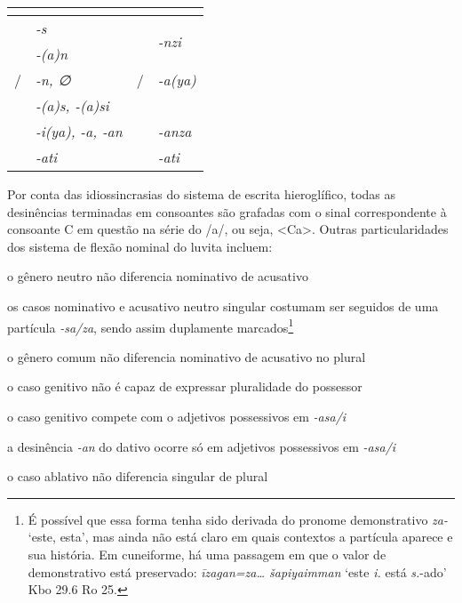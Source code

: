 \begin{center}
	\begin{tabular}[c]{llll}
		\toprule
		                      & \Sg{}\emph{}             &                       & \Pl{}\emph{}                   \\
		\midrule
		\Nom{} \Com{}         & \emph{-s}                & \Nom{} \Com{}         & \multirow{2}{4em}{\emph{-nzi}} \\
		\Acu{} \Com{}         & \emph{-{(a)}n}           & \Acu{} \Com{}         &                                \\
		\Nom{}/\Acu{} \Neut{} & \emph{-n, ∅}             & \Nom{}/\Acu{} \Neut{} & \emph{-a{(ya)}}                \\
		\Gen{}                & \emph{-{(a)}s, -{(a)}si} &                       &                                \\
		\Dat{}                & \emph{-i{(ya)}, -a, -an} & \Dat{}                & \emph{-anza}                   \\
		\Abl{}                & \emph{-ati}              & \Abl{}                & \emph{-ati}                    \\
		\bottomrule
	\end{tabular}
\end{center}

Por conta das idiossincrasias do sistema de escrita hieroglífico, todas as
desinências terminadas em consoantes são grafadas com o sinal correspondente à
consoante C em questão na série do /a/, ou seja, <Ca>.
Outras particularidades dos sistema de flexão nominal do luvita incluem:
\begin{compactitem}
	\item o gênero neutro não diferencia nominativo de acusativo
	\item os casos nominativo e acusativo neutro singular costumam ser seguidos de
	uma partícula \emph{-sa\slash{}za}, sendo assim duplamente
	marcados\footnote{É possível que essa forma tenha sido derivada do pronome
		demonstrativo \emph{za-} `este, esta', mas ainda não está claro em quais
		contextos a partícula aparece e sua história. Em cuneiforme, há uma passagem
		em que o valor de demonstrativo está preservado: \emph{īzagan=za\ldots{}
			šapiyaimman} `este \emph{i.} está \emph{s.}-ado' Kbo 29.6 Ro 25.}
	\item o gênero comum não diferencia nominativo de acusativo no plural
	\item o caso genitivo não é capaz de expressar pluralidade do possessor
	\item o caso genitivo compete com o adjetivos possessivos em
	\emph{-asa\slash{}i}
	\item a desinência \emph{-an} do dativo ocorre só em adjetivos possessivos
	em \emph{-asa\slash{}i}
	\item o caso ablativo não diferencia singular de plural
\end{compactitem}


